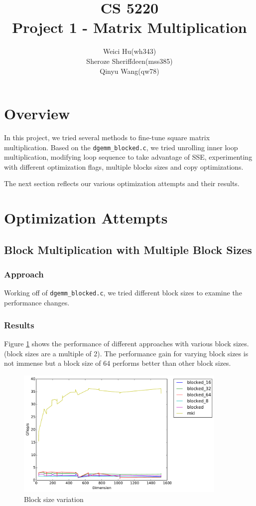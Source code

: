 \documentclass[11pt]{article}
\theoremstyle{plain}
\theoremstyle{definition}
\begin{document}
\title{CS 5220\\ Project 1 - Matrix Multiplication}
\author{Weici Hu(wh343)\\ Sheroze Sheriffdeen(mss385)\\ Qinyu Wang(qw78)}
\maketitle

\section{Overview}


In this project, we tried several methods to fine-tune square matrix multiplication.
Based on the \texttt{dgemm\_blocked.c}, we tried unrolling inner loop multiplication, modifying loop sequence to take advantage of SSE, experimenting with different optimization flags, multiple blocks sizes and copy optimizations. 

The next section reflects our various optimization attempts and their results. 

\section{Optimization Attempts}
\subsection{Block Multiplication with Multiple Block Sizes}
\subsubsection{Approach}
Working off of \texttt{dgemm\_blocked.c}, we tried different block sizes to examine the performance changes. 
\subsubsection{Results}
Figure \ref{pow_2_blocks} shows the performance of different approaches with various block sizes. (block sizes are a multiple of 2). The performance gain for varying block sizes is not immense but a block size of 64 performs better than other block sizes. \\

\begin{figure}[H]
    \includegraphics[width=0.9\textwidth]{timing_block_size_changes.pdf}
    \caption{Block size variation}
    \label{pow_2_blocks}
\end{figure} 
\end{document}

